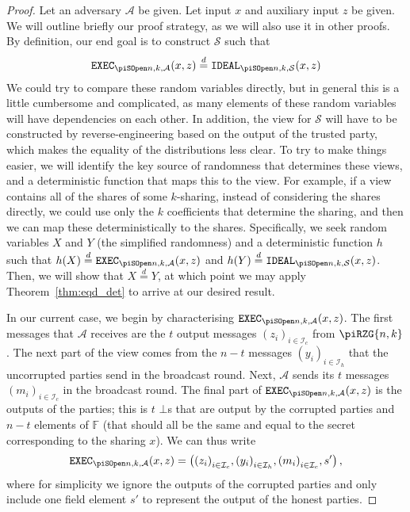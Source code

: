\documentclass{article}
\newcommand{\eqd}[0]{\stackrel{d}{=}}
\theoremstyle{remark}
\newcommand{\F}{\mathbb{F}}
\begin{document}
\begin{proof}
	\newcommand{\proto}{\piSOpen{n,k}}

	Let an adversary $\mathcal{A}$ be given. Let input $x$ and auxiliary input
	$z$ be given. We will outline briefly our proof strategy, as we will also
	use it in other proofs. By definition, our end goal is to construct
	$\mathcal{S}$ such that
	\begin{align*}
		\execD \eqd \idealD
	\end{align*}
	We could try to compare these random variables directly, but in general
	this is a little cumbersome and complicated, as many elements of these
	random variables will have dependencies on each other. In addition, the
	view for $\mathcal{S}$ will have to be constructed by reverse-engineering
	based on the output of the trusted party, which makes the equality of the
	distributions less clear. To try to make things easier, we will identify
	the key source of randomness that determines these views, and a
	deterministic function that maps this to the view. For example, if a view
	contains all of the shares of some $k$-sharing, instead of considering the
	shares directly, we could use only the $k$ coefficients that determine the
	sharing, and then we can map these deterministically to the shares.
	Specifically, we seek random variables $X$ and $Y$ (the simplified
	randomness) and a deterministic function $h$ such that $h(X) \eqd \execD$
	and $h(Y) \eqd \idealD$. Then, we will show that $X \eqd Y$, at which point
	we may apply Theorem~\ref{thm:eqd_det} to arrive at our desired result.

	In our current case, we begin by characterising $\execD$. The first
	messages that $\mathcal{A}$ receives are the $t$ output messages
	${(z_i)}_{i \in \mathcal{I}_c}$ from $\piRZG{n, k}$. The next part of the
	view comes from the $n - t$ messages ${(y_i)}_{i \in \mathcal{I}_h}$ that
	the uncorrupted parties send in the broadcast round. Next, $\mathcal{A}$
	sends its $t$ messages ${(m_i)}_{i \in \mathcal{I}_c}$ in the broadcast
	round. The final part of $\execD$ is the outputs of the parties; this is
	$t$ $\bot$s that are output by the corrupted parties and $n-t$ elements of
	$\F$ (that should all be the same and equal to the secret corresponding to
	the sharing $x$). We can thus write
	\begin{align*}
		\execD
		=
		\left(
			{(z_i)}_{i \in \mathcal{I}_c},
			{(y_i)}_{i \in \mathcal{I}_h},
			{(m_i)}_{i \in \mathcal{I}_c},
			s'
		\right),
	\end{align*}
	where for simplicity we ignore the outputs of the corrupted parties and
	only include one field element $s'$ to represent the output of the honest
	parties.


\end{proof}
\end{document}
